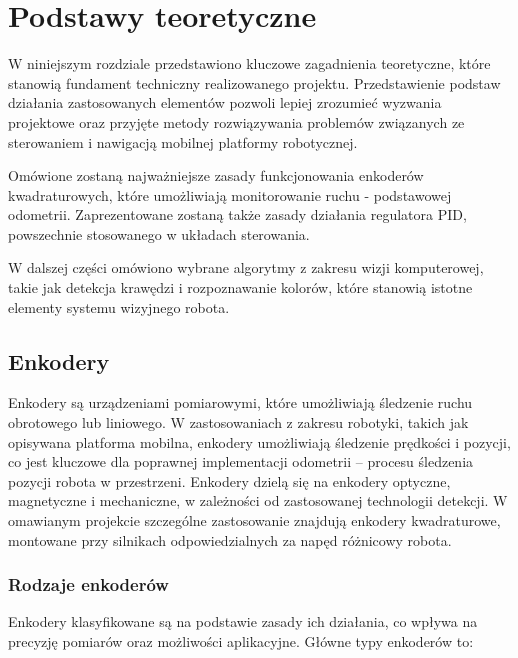 \chapter{Podstawy teoretyczne}
\label{ch:podstawy-teoretyczne}


W niniejszym rozdziale przedstawiono kluczowe zagadnienia teoretyczne, które stanowią fundament techniczny realizowanego projektu. Przedstawienie podstaw działania zastosowanych elementów pozwoli lepiej zrozumieć wyzwania projektowe oraz przyjęte metody rozwiązywania problemów związanych ze sterowaniem i nawigacją mobilnej platformy robotycznej.

Omówione zostaną najważniejsze zasady funkcjonowania enkoderów kwadraturowych, które umożliwiają monitorowanie ruchu - podstawowej odometrii. Zaprezentowane zostaną także zasady działania regulatora PID, powszechnie stosowanego w układach sterowania.

W dalszej części omówiono wybrane algorytmy z zakresu wizji komputerowej, takie jak detekcja krawędzi i rozpoznawanie kolorów, które stanowią istotne elementy systemu wizyjnego robota.

\section{Enkodery}

Enkodery są urządzeniami pomiarowymi, które umożliwiają śledzenie ruchu obrotowego lub liniowego. W zastosowaniach z zakresu robotyki, takich jak opisywana platforma mobilna, enkodery umożliwiają śledzenie prędkości i pozycji, co jest kluczowe dla poprawnej implementacji odometrii – procesu śledzenia pozycji robota w przestrzeni. Enkodery dzielą się na enkodery optyczne, magnetyczne i mechaniczne, w zależności od zastosowanej technologii detekcji. W omawianym projekcie szczególne zastosowanie znajdują enkodery kwadraturowe, montowane przy silnikach odpowiedzialnych za napęd różnicowy robota.

\subsection{Rodzaje enkoderów}

Enkodery klasyfikowane są na podstawie zasady ich działania, co wpływa na precyzję pomiarów oraz możliwości aplikacyjne. Główne typy enkoderów to:

